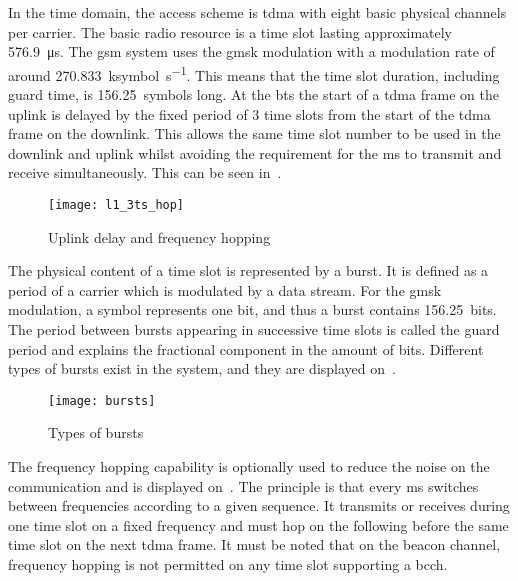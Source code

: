       In the time domain, the access scheme is \gls{tdma} with eight
      basic physical channels per carrier. The basic radio resource is a
      time slot lasting approximately \SI{576.9}{\micro\second}. The
      \gls{gsm} system uses the \gls{gmsk} modulation with a modulation
      rate of around \SI{270.833}{\kilo symbol\per\second}. This means
      that the time slot duration, including guard time, is
      \SI{156.25}{symbols} long. At the \gls{bts} the start of a
      \gls{tdma} frame on the uplink is delayed by the fixed period of 3
      time slots from the start of the \gls{tdma} frame on the downlink.
      This allows the same time slot number to be used in the downlink
      and uplink whilst avoiding the requirement for the \gls{ms} to
      transmit and receive simultaneously. This can be seen
      in~.

      \begin{figure}[h]
        \centering
        \texttt{[image: l1\_3ts\_hop]}
        \caption{Uplink delay and frequency hopping~\cite{3gpp_ts_2015-4}}
        \label{fig:l1_3ts_hop}
      \end{figure}

      The physical content of a time slot is represented by a burst. It
      is defined as a period of a carrier which is modulated by a data
      stream. For the \gls{gmsk} modulation, a symbol represents one bit,
      and thus a burst contains \SI{156.25}{bits}. The period between
      bursts appearing in successive time slots is called the guard
      period and explains the fractional component in the amount of
      bits. Different types of bursts exist in the system, and they are
      displayed on~.

      \begin{figure}[h]
        \centering
        \texttt{[image: bursts]}
        \caption{Types of bursts~\cite{3gpp_ts_2015-3}}
        \label{fig:bursts}
      \end{figure}

      The frequency hopping capability is optionally used to reduce the
      noise on the communication and is displayed
      on~. The principle is that every \gls{ms}
      switches between frequencies according to a given sequence. It
      transmits or receives during one time slot on a fixed frequency
      and must hop on the following before the same time slot on the
      next \gls{tdma} frame. It must be noted that on the beacon
      channel, frequency hopping is not permitted on any time slot
      supporting a \gls{bcch}.

